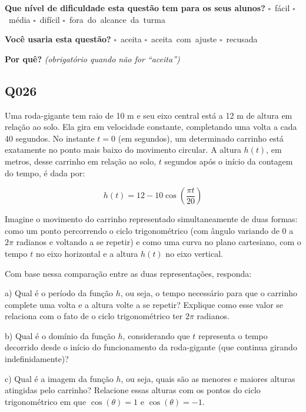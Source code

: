 \documentclass[11pt,a4paper]{article}
\begin{document}
\textbf{Que nível de dificuldade esta questão tem para os seus alunos?}\quad
\mbox{$\square$~fácil} \quad \mbox{$\square$~média} \quad
\mbox{$\square$~difícil} \quad \mbox{$\square$~fora do alcance da turma}

\textbf{Você usaria esta questão?}\quad
\mbox{$\square$~aceita} \quad \mbox{$\square$~aceita com ajuste} \quad
\mbox{$\square$~recusada}

\textbf{Por quê?} \emph{(obrigatório quando não for ``aceita'')}

\underline{\hspace{\linewidth}}

\underline{\hspace{\linewidth}}
\vspace{0.6em}

\begin{samepage}
\subsection*{Q026}
Uma roda-gigante tem raio de 10 m e seu eixo central está a 12 m de altura em relação ao solo. Ela gira em velocidade constante, completando uma volta a cada 40 segundos. No instante $t = 0$ (em segundos), um determinado carrinho está exatamente no ponto mais baixo do movimento circular. A altura $h(t)$, em metros, desse carrinho em relação ao solo, $t$ segundos após o início da contagem do tempo, é dada por:

$$h(t) = 12 - 10\cos\left(\dfrac{\pi t}{20}\right)$$

Imagine o movimento do carrinho representado simultaneamente de duas formas: como um ponto percorrendo o ciclo trigonométrico (com ângulo variando de $0$ a $2\pi$ radianos e voltando a se repetir) e como uma curva no plano cartesiano, com o tempo $t$ no eixo horizontal e a altura $h(t)$ no eixo vertical.

Com base nessa comparação entre as duas representações, responda:

a) Qual é o período da função $h$, ou seja, o tempo necessário para que o carrinho complete uma volta e a altura volte a se repetir? Explique como esse valor se relaciona com o fato de o ciclo trigonométrico ter $2\pi$ radianos.

b) Qual é o domínio da função $h$, considerando que $t$ representa o tempo decorrido desde o início do funcionamento da roda-gigante (que continua girando indefinidamente)?

c) Qual é a imagem da função $h$, ou seja, quais são as menores e maiores alturas atingidas pelo carrinho? Relacione essas alturas com os pontos do ciclo trigonométrico em que $\cos(\theta) = 1$ e $\cos(\theta) = -1$.


\end{samepage}
\end{document}
